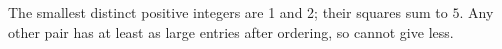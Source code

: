 The smallest distinct positive integers are 1 and 2; their squares sum to $\boxed5$. Any other pair has at least as large entries after ordering, so cannot give less.
